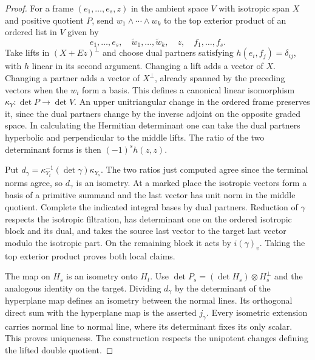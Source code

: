 \documentclass[a4paper,11pt]{article}
\theoremstyle{definition}
\theoremstyle{remark}
\numberwithin{equation}{section}
\begin{document}
\begin{proof}
For a frame \((e_1,\ldots,e_s,z)\) in the ambient space \(V\)
with isotropic span \(X\) and positive quotient \(P\), send
\(w_1\wedge\cdots\wedge w_k\) to the top exterior product of
an ordered list in \(V\) given by
\[
     e_1,\ldots,e_s,\quad\widetilde w_1,\ldots,\widetilde w_k,
             \quad z,\quad f_1,\ldots,f_s .
\]
Take lifts in \((X+Ez)^\perp\) and choose dual partners satisfying
\(h(e_i,f_j)=\delta_{ij}\), with \(h\) linear in its second
argument. Changing a lift adds a vector of \(X\). Changing a
partner adds a vector of \(X^\perp\), already spanned by the
preceding vectors when the \(w_i\) form a basis. This defines
a canonical linear isomorphism \(\kappa_Y:\det P\to\det V\).
An upper unitriangular change in the ordered frame preserves it,
since the dual partners change by the inverse adjoint on the
opposite graded space. In calculating the Hermitian determinant
one can take the dual partners hyperbolic and perpendicular to
the middle lifts. The ratio of the two determinant forms is then
\((-1)^s h(z,z)\).

Put \(d_\gamma=\kappa_{Y_t}^{-1}(\det\gamma)\kappa_{Y_s}\).
The two ratios just computed agree since the terminal norms
agree, so \(d_\gamma\) is an isometry. At a marked place
the isotropic vectors form a basis of a primitive summand and
the last vector has unit norm in the middle quotient. Complete
the indicated integral bases by dual partners. Reduction of
\(\gamma\) respects the isotropic filtration, has determinant
one on the ordered isotropic block and its dual, and takes the
source last vector to the target last vector modulo the isotropic
part. On the remaining block it acts by \(i(\gamma)_v\).
Taking the top exterior product proves both local claims.

The map on \(H_s\) is an isometry onto \(H_t\).
Use \(\det P_s=(\det H_s)\otimes H_s^\perp\) and the analogous
identity on the target. Dividing \(d_\gamma\) by the determinant
of the hyperplane map defines an isometry between the normal
lines. Its orthogonal direct sum with the hyperplane map is
the asserted \(j_\gamma\). Every isometric extension carries
normal line to normal line, where its determinant fixes its
only scalar. This proves uniqueness. The construction respects
the unipotent changes defining the lifted double quotient.
\end{proof}
\end{document}
